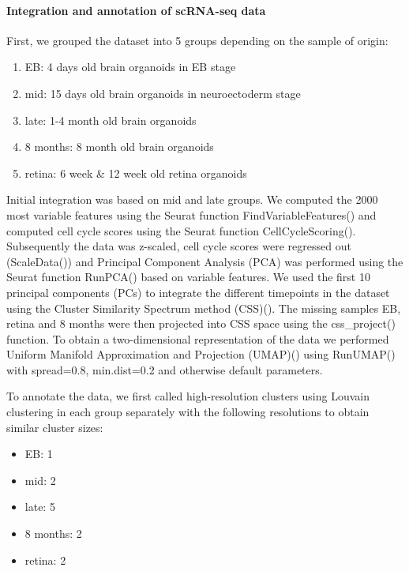 \paragraph{Integration and annotation of scRNA-seq data}
First, we grouped the dataset into 5 groups depending on the sample of origin:  

\begin{enumerate}
    \item EB: 4 days old brain organoids in EB stage
    \item mid: 15 days old brain organoids in neuroectoderm stage
    \item late: 1-4 month old brain organoids
    \item 8 months: 8 month old brain organoids
    \item retina: 6 week \& 12 week old retina organoids
\end{enumerate}

Initial integration was based on mid and late groups. We computed the 2000 most variable features using the Seurat function FindVariableFeatures() and computed cell cycle scores using the Seurat function CellCycleScoring(). Subsequently the data was z-scaled, cell cycle scores were regressed out (ScaleData()) and Principal Component Analysis (PCA) was performed using the Seurat function RunPCA() based on variable features. We used the first 10 principal components (PCs) to integrate the different timepoints in the dataset using the Cluster Similarity Spectrum method (CSS)(\cite{he_css_2020}). The missing samples EB, retina and 8 months were then projected into CSS space using the css\_project() function. To obtain a two-dimensional representation of the data we performed Uniform Manifold Approximation and Projection (UMAP)(\cite{becht_dimensionality_2019}) using RunUMAP() with spread=0.8, min.dist=0.2 and otherwise default parameters.

To annotate the data, we first called high-resolution clusters using Louvain clustering in each group separately with the following resolutions to obtain similar cluster sizes:

\begin{itemize}
    \item EB: 1
    \item mid: 2
    \item late: 5
    \item 8 months: 2
    \item retina: 2
\end{itemize}

